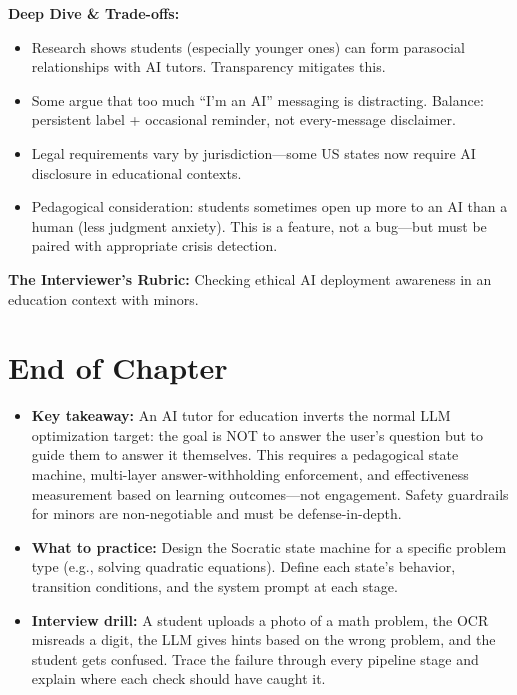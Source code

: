 \textbf{Deep Dive \& Trade-offs:}
\begin{itemize}
  \item Research shows students (especially younger ones) can form parasocial relationships with AI tutors. Transparency mitigates this.
  \item Some argue that too much ``I'm an AI'' messaging is distracting. Balance: persistent label + occasional reminder, not every-message disclaimer.
  \item Legal requirements vary by jurisdiction---some US states now require AI disclosure in educational contexts.
  \item Pedagogical consideration: students sometimes open up more to an AI than a human (less judgment anxiety). This is a feature, not a bug---but must be paired with appropriate crisis detection.
\end{itemize}

\textbf{The Interviewer's Rubric:} Checking ethical AI deployment awareness in an education context with minors.

\section*{End of Chapter}

\begin{itemize}
  \item \textbf{Key takeaway:} An AI tutor for education inverts the normal LLM optimization target: the goal is NOT to answer the user's question but to guide them to answer it themselves. This requires a pedagogical state machine, multi-layer answer-withholding enforcement, and effectiveness measurement based on learning outcomes---not engagement. Safety guardrails for minors are non-negotiable and must be defense-in-depth.
  \item \textbf{What to practice:} Design the Socratic state machine for a specific problem type (e.g., solving quadratic equations). Define each state's behavior, transition conditions, and the system prompt at each stage.
  \item \textbf{Interview drill:} A student uploads a photo of a math problem, the OCR misreads a digit, the LLM gives hints based on the wrong problem, and the student gets confused. Trace the failure through every pipeline stage and explain where each check should have caught it.
\end{itemize}
